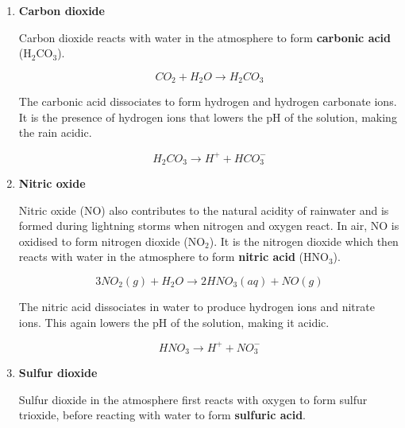 
\begin{enumerate}
\item{\textbf{Carbon dioxide}}

Carbon dioxide reacts with water in the atmosphere to form \textbf{carbonic acid} (H$_{2}$CO$_{3}$). 

\begin{equation*}
CO_{2} + H_{2}O \rightarrow H_{2}CO_{3}
\end{equation*}

The carbonic acid dissociates to form hydrogen and hydrogen carbonate ions. It is the presence of hydrogen ions that lowers the pH of the solution, making the rain acidic.

\begin{equation*}
H_{2}CO_{3} \rightarrow H^{+} + HCO_{3}^{-}
\end{equation*}

\item{\textbf{Nitric oxide}}

Nitric oxide (NO) also contributes to the natural acidity of rainwater and is formed during lightning storms when nitrogen and oxygen react. In air, NO is oxidised to form nitrogen dioxide (NO$_{2}$). It is the nitrogen dioxide which then reacts with water in the atmosphere to form \textbf{nitric acid} (HNO$_{3}$).

\begin{equation*}
3NO_{2} (g) + H_{2}O \rightarrow 2HNO_{3} (aq) + NO (g)
\end{equation*}

The nitric acid dissociates in water to produce hydrogen ions and nitrate ions. This again lowers the pH of the solution, making it acidic.

\begin{equation*}
HNO_{3} \rightarrow H^{+} + NO_{3}^{-}
\end{equation*}

\item{\textbf{Sulfur dioxide}}

Sulfur dioxide in the atmosphere first reacts with oxygen to form sulfur trioxide, before reacting with water to form \textbf{sulfuric acid}.


\end{enumerate}
